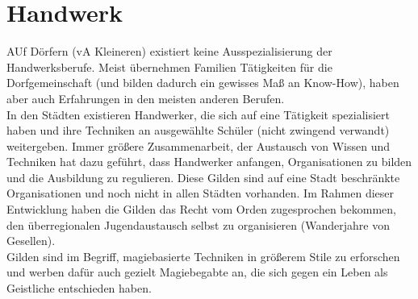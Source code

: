 \section{Handwerk}
AUf Dörfern (vA Kleineren) existiert keine Ausspezialisierung der Handwerksberufe. 
Meist übernehmen Familien Tätigkeiten für die Dorfgemeinschaft (und bilden dadurch ein gewisses Maß an Know-How), haben aber auch Erfahrungen in den meisten anderen Berufen.\\
In den Städten existieren Handwerker, die sich auf eine Tätigkeit spezialisiert haben und ihre Techniken an ausgewählte Schüler (nicht zwingend verwandt) weitergeben. 
Immer größere Zusammenarbeit, der Austausch von Wissen und Techniken hat dazu geführt, dass Handwerker anfangen, Organisationen zu bilden und die Ausbildung zu regulieren. 
Diese Gilden sind auf eine Stadt beschränkte Organisationen und noch nicht in allen Städten vorhanden.
Im Rahmen dieser Entwicklung haben die Gilden das Recht vom Orden zugesprochen bekommen, den überregionalen Jugendaustausch selbst zu organisieren (Wanderjahre von Gesellen).\\ 
Gilden sind im Begriff, magiebasierte Techniken in größerem Stile zu erforschen und werben dafür auch gezielt Magiebegabte an, die sich gegen ein Leben als Geistliche entschieden haben.

